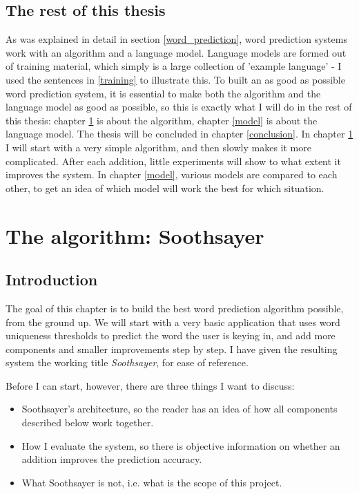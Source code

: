 \documentclass[12pt]{article}
\let\stdsection\section
\renewcommand\section{\newpage\stdsection}
\begin{document}
\subsection{The rest of this thesis} \label{restofthisthesis}
As was explained in detail in section \ref{word_prediction}, word prediction systems work with an algorithm and a language model. Language models are formed out of training material, which simply is a large collection of 'example language' - I used the sentences in \ref{training} to illustrate this. To built an as good as possible word prediction system, it is essential to make both the algorithm and the language model as good as possible, so this is exactly what I will do in the rest of this thesis: chapter \ref{algorithm} is about the algorithm, chapter \ref{model} is about the language model. The thesis will be concluded in chapter \ref{conclusion}. In chapter \ref{algorithm} I will start with a very simple algorithm, and then slowly makes it more complicated. After each addition, little experiments will show to what extent it improves the system. In chapter \ref{model}, various models are compared to each other, to get an idea of which model will work the best for which situation. 





\section{The algorithm: Soothsayer} \label{algorithm}

\subsection{Introduction}

The goal of this chapter is to build the best word prediction algorithm possible, from the ground up. We will start with a very basic application that uses word uniqueness thresholds to predict the word the user is keying in, and add more components and smaller improvements step by step. I have given the resulting system the working title \emph{Soothsayer}, for ease of reference. 

Before I can start, however, there are three things I want to discuss: 

\begin{itemize}
\item Soothsayer's architecture, so the reader has an idea of how all components described below work together.
\item How I evaluate the system, so there is objective information on whether an addition improves the prediction accuracy.
\item What Soothsayer is not, i.e. what is the scope of this project.
\end{itemize}
\end{document}

